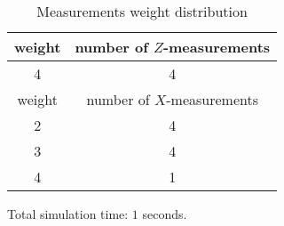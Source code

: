 \documentclass[12pt]{article}
\begin{document}
\begin{table}[h]
\centering
\begin{tabular}{c c}
\hline
weight & number of $Z$-measurements\\
\hline
4 & 4\\
\hline
\hline
weight & number of $X$-measurements\\
\hline
2 & 4\\
3 & 4\\
4 & 1\\
\hline
\end{tabular}
\caption{Measurements weight distribution}
\end{table}
\vspace{.3cm}



\vspace{2cm}
Total simulation time: $1$ seconds.
\end{document}
